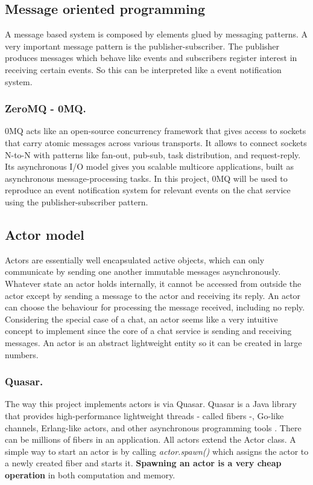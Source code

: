 \subsection{Message oriented programming}

A message based system is composed by elements glued by messaging patterns. 
A very important message pattern is the publisher-subscriber. The publisher produces messages which behave like events and subscribers register interest in receiving certain events. So this can be interpreted like a event notification system.


\subsubsection{ZeroMQ - 0MQ.}
0MQ acts like an open-source concurrency framework that gives access to sockets that carry atomic messages across various transports. It allows to connect sockets N-to-N with patterns like fan-out, pub-sub, task distribution, and request-reply. Its asynchronous I/O model gives you scalable multicore applications, built as asynchronous message-processing tasks.
In this project, 0MQ will be used to reproduce an event notification system for relevant events on the chat service using the publisher-subscriber pattern.

\subsection{Actor model}

Actors are essentially well encapsulated active objects, which can only communicate by sending one another immutable messages asynchronously. Whatever state an actor holds internally, it cannot be accessed from outside the actor except by sending a message to the actor and receiving its reply. An actor can choose the behaviour for processing the message received, including no reply.
Considering the special case of a chat, an actor seems like a very intuitive concept to implement since the core of a chat service is sending and receiving messages. An actor is an abstract lightweight entity so it can be created in large numbers.

\subsubsection{Quasar.} 
The way this project implements actors is via Quasar. Quasar is a Java library that provides high-performance lightweight threads - called fibers -, Go-like channels, Erlang-like actors, and other asynchronous programming tools \cite{quasar}. There can be millions of fibers in an application. All actors extend the Actor class. A simple way to start an actor is by calling \emph{actor.spawn()} which assigns the actor to a newly created fiber and starts it. \textbf{Spawning an actor is a very cheap operation} in both computation and memory.





